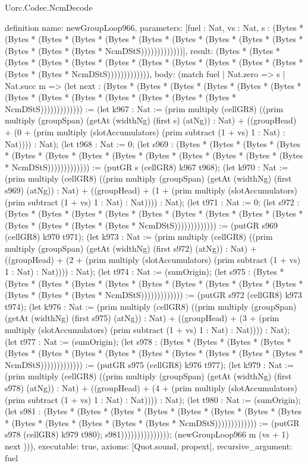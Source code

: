 \begin{lexlean}{Uorc.Codec.NcmDecode}
\begin{semanticmodule}
definition{
  name: newGroupLoop966,
  parameters: [fuel : Nat, vs : Nat, s : (Bytes * (Bytes * (Bytes * (Bytes * (Bytes * (Bytes * (Bytes * (Bytes * (Bytes * (Bytes * (Bytes * (Bytes * (Bytes * NcmDStS)))))))))))))],
  result: (Bytes * (Bytes * (Bytes * (Bytes * (Bytes * (Bytes * (Bytes * (Bytes * (Bytes * (Bytes * (Bytes * (Bytes * (Bytes * NcmDStS))))))))))))),
  body: (match fuel
    | Nat.zero => s
    | Nat.succ m => (let next : (Bytes * (Bytes * (Bytes * (Bytes * (Bytes * (Bytes * (Bytes * (Bytes * (Bytes * (Bytes * (Bytes * (Bytes * (Bytes * NcmDStS))))))))))))) := (let k967 : Nat := (prim multiply (cellGR8) ((prim multiply (groupSpan) (getAt (widthNg) (first s) (atNg)) : Nat) + ((groupHead) + (0 + (prim multiply (slotAccumulators) (prim subtract (1 + vs) 1 : Nat) : Nat)))) : Nat); (let t968 : Nat := 0; (let s969 : (Bytes * (Bytes * (Bytes * (Bytes * (Bytes * (Bytes * (Bytes * (Bytes * (Bytes * (Bytes * (Bytes * (Bytes * (Bytes * NcmDStS))))))))))))) := (putGR s (cellGR8) k967 t968); (let k970 : Nat := (prim multiply (cellGR8) ((prim multiply (groupSpan) (getAt (widthNg) (first s969) (atNg)) : Nat) + ((groupHead) + (1 + (prim multiply (slotAccumulators) (prim subtract (1 + vs) 1 : Nat) : Nat)))) : Nat); (let t971 : Nat := 0; (let s972 : (Bytes * (Bytes * (Bytes * (Bytes * (Bytes * (Bytes * (Bytes * (Bytes * (Bytes * (Bytes * (Bytes * (Bytes * (Bytes * NcmDStS))))))))))))) := (putGR s969 (cellGR8) k970 t971); (let k973 : Nat := (prim multiply (cellGR8) ((prim multiply (groupSpan) (getAt (widthNg) (first s972) (atNg)) : Nat) + ((groupHead) + (2 + (prim multiply (slotAccumulators) (prim subtract (1 + vs) 1 : Nat) : Nat)))) : Nat); (let t974 : Nat := (sumOrigin); (let s975 : (Bytes * (Bytes * (Bytes * (Bytes * (Bytes * (Bytes * (Bytes * (Bytes * (Bytes * (Bytes * (Bytes * (Bytes * (Bytes * NcmDStS))))))))))))) := (putGR s972 (cellGR8) k973 t974); (let k976 : Nat := (prim multiply (cellGR8) ((prim multiply (groupSpan) (getAt (widthNg) (first s975) (atNg)) : Nat) + ((groupHead) + (3 + (prim multiply (slotAccumulators) (prim subtract (1 + vs) 1 : Nat) : Nat)))) : Nat); (let t977 : Nat := (sumOrigin); (let s978 : (Bytes * (Bytes * (Bytes * (Bytes * (Bytes * (Bytes * (Bytes * (Bytes * (Bytes * (Bytes * (Bytes * (Bytes * (Bytes * NcmDStS))))))))))))) := (putGR s975 (cellGR8) k976 t977); (let k979 : Nat := (prim multiply (cellGR8) ((prim multiply (groupSpan) (getAt (widthNg) (first s978) (atNg)) : Nat) + ((groupHead) + (4 + (prim multiply (slotAccumulators) (prim subtract (1 + vs) 1 : Nat) : Nat)))) : Nat); (let t980 : Nat := (sumOrigin); (let s981 : (Bytes * (Bytes * (Bytes * (Bytes * (Bytes * (Bytes * (Bytes * (Bytes * (Bytes * (Bytes * (Bytes * (Bytes * (Bytes * NcmDStS))))))))))))) := (putGR s978 (cellGR8) k979 t980); s981))))))))))))))); (newGroupLoop966 m (vs + 1) next ))),
  executable: true,
  axioms: [Quot.sound, propext],
  recursive_argument: fuel
}


\end{semanticmodule}
\end{lexlean}

